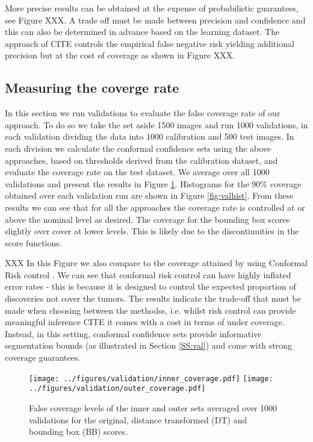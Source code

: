 More precise results can be obtained at the expense of probabilistic guarantees, see Figure XXX. A trade off must be made between precision and confidence and this can also be determined in advance based on the learning dataset. The approach of CITE controls the empirical false negative risk yielding additional precision but at the cost of coverage as shown in Figure XXX. 

\subsection{Measuring the coverge rate}\label{SS:cov}
In this section we run validations to evaluate the false coverage rate of our approach. To do so we take the set aside 1500 images and run 1000 validations, in each validation dividing the data into 1000 calibration and 500 test images. In each division we calculate the conformal confidence sets using the above approaches, based on thresholds derived from the calibration dataset, and evaluate the coverage rate on the test dataset. We average over all 1000 validations and present the results in Figure \ref{fig:coverage}. Histograms for the $90\%$ coverage obtained over each validation run are shown in Figure \ref{fig:valhist}. From these results we can see that for all the approaches the coverage rate is controlled at or above the nominal level as desired. The coverage for the bounding box scores slightly over cover at lower levels. This is likely due to the discontinuities in the score functions. 

XXX In this Figure we also compare to the coverage attained by using Conformal Risk control \cite{}. We can see that conformal risk control can have highly inflated error rates - this is because it is designed to control the expected proportion of discoveries not cover the tumors. The results indicate the trade-off that must be made when choosing between the methodss, i.e. whilst risk control can provide meaningful inference CITE it comes with a cost in terms of under coverage. Instead, in this setting, conformal confidence sets provide informative segmentation bounds (as illustrated in Section \ref{SS:val}) and come with strong coverage guarantees. 
\begin{figure}
	\begin{center}
		\texttt{[image: ../figures/validation/inner\_coverage.pdf]}
		\quad\quad
		\texttt{[image: ../figures/validation/outer\_coverage.pdf]}
	\end{center}
	\caption{False coverage levels of the inner and outer sets averaged over 1000 validations for the original, distance transformed (DT) and bounding box (BB) scores.}\label{fig:coverage}
\end{figure}

